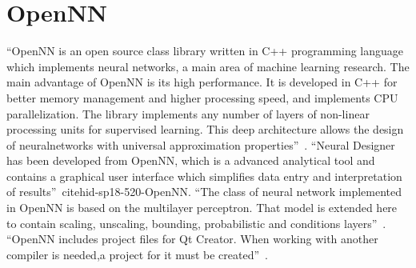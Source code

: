 \section{OpenNN}

``OpenNN is an open source class library written in C++ programming language
which implements neural networks, a main area of machine learning research.
The main advantage of OpenNN is its high performance. It is developed in 
C++ for better memory management and higher processing speed, and 
implements CPU parallelization. The library implements any number of layers
of non-linear processing units for supervised learning. This deep 
architecture allows the design of neuralnetworks with universal approximation
properties''~\cite{hid-sp18-520-OpenNN}.
``Neural Designer has been developed from OpenNN, which is a advanced analytical
tool and contains a graphical user interface which simplifies data entry
and interpretation of results''~cite{hid-sp18-520-OpenNN}.
``The class of neural network implemented in OpenNN is based on the multilayer 
perceptron. That model is extended here to contain scaling, unscaling, bounding,
probabilistic and conditions layers''~\cite{hid-sp18-520-OpenNNn}.
``OpenNN includes project files for Qt Creator. When working with another 
compiler is needed,a project for it must be created''~\cite{hid-sp18-520-OpenNNb}. 

